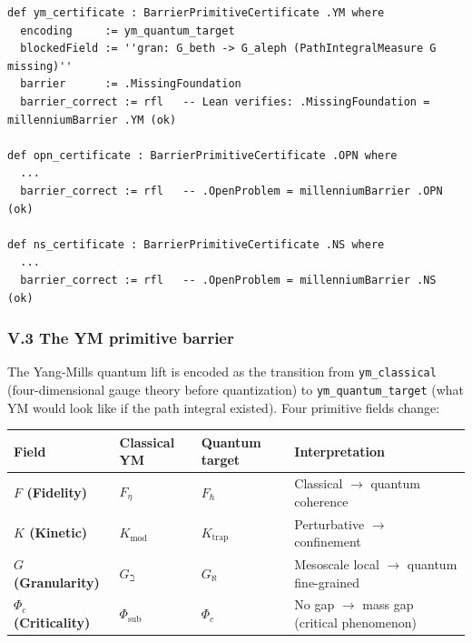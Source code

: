 \documentclass[12pt,a4paper]{article}
\begin{document}
\begin{lstlisting}[language=lean]
def ym_certificate : BarrierPrimitiveCertificate .YM where
  encoding     := ym_quantum_target
  blockedField := ''gran: G_beth -> G_aleph (PathIntegralMeasure G missing)''
  barrier      := .MissingFoundation
  barrier_correct := rfl   -- Lean verifies: .MissingFoundation = millenniumBarrier .YM (ok)

def opn_certificate : BarrierPrimitiveCertificate .OPN where
  ...
  barrier_correct := rfl   -- .OpenProblem = millenniumBarrier .OPN (ok)

def ns_certificate : BarrierPrimitiveCertificate .NS where
  ...
  barrier_correct := rfl   -- .OpenProblem = millenniumBarrier .NS (ok)
\end{lstlisting}

\subsubsection{V.3 The YM primitive barrier}

The Yang-Mills quantum lift is encoded as the transition from \texttt{ym\_classical} (four-dimensional gauge theory before quantization) to \texttt{ym\_quantum\_target} (what YM would look like if the path integral existed). Four primitive fields change:

\begin{table}[htbp]
\centering
\small
{}
\begin{tabularx}{\textwidth}{>{\centering\arraybackslash}X >{\centering\arraybackslash}X >{\centering\arraybackslash}X >{\centering\arraybackslash}X}
\toprule
\rowcolor{gray!25}\textbf{Field} & \textbf{Classical YM} & \textbf{Quantum target} & \textbf{Interpretation} \\
\midrule
\rowcolors{1}{white}{gray!10}
\textbf{$F$ (Fidelity)} & $F_{\eta}$ & $F_{\hbar}$ & Classical $\rightarrow$ quantum coherence \\
\textbf{$K$ (Kinetic)} & $K_\text{mod}$ & $K_\text{trap}$ & Perturbative $\rightarrow$ confinement \\
\textbf{$G$ (Granularity)} & $G_{\beth}$ & $G_{\aleph}$ & Mesoscale local $\rightarrow$ quantum fine-grained \\
\textbf{$\Phi_c$ (Criticality)} & $\Phi_\text{sub}$ & $\Phi_c$ & No gap $\rightarrow$ mass gap (critical phenomenon) \\
\bottomrule
\end{tabularx}
\end{table}
\end{document}
